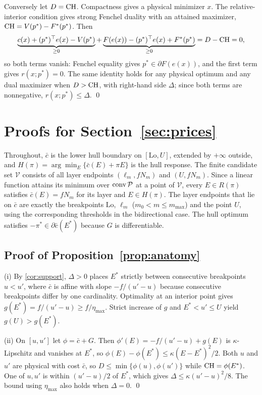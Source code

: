 Conversely let $D=\mathrm{CH}$. Compactness gives a physical minimizer $x$. The
relative-interior condition gives strong Fenchel duality with an attained
maximizer, $\mathrm{CH}=V(p^*)-F^*(p^*)$. Then
\[
 \underbrace{c(x)+(p^*)^\top e(x)-V(p^*)}_{\ge0}
 +\underbrace{F(e(x))-(p^*)^\top e(x)+F^*(p^*)}_{\ge0}=D-\mathrm{CH}=0,
\]
so both terms vanish: Fenchel equality gives $p^*\in\partial F(e(x))$, and the
first term gives $r(x;p^*)=0$. The same identity holds for any physical optimum and
any dual maximizer when $D>\mathrm{CH}$, with right-hand side $\Delta$; since both terms are
nonnegative, $r(x;p^*)\le\Delta$. \qed

\section{Proofs for Section~\ref{sec:prices}}\label{app:prices}

Throughout, $\bar c$ is the lower hull boundary on $[\mathrm{Lo},U]$, extended by
$+\infty$ outside, and $H(\pi)=\arg\min_E\{\bar c(E)+\pi E\}$ is the hull response.
The finite candidate set $\mathcal V$ consists of all layer endpoints $(\ell_m,fN_m)$
and $(U,fN_m)$. Since a linear function attains its minimum over $\operatorname{conv}\mathcal P$
at a point of $\mathcal V$, every $E\in R(\pi)$ satisfies $\bar c(E)=fN_m$ for its
layer and $E\in H(\pi)$. The layer endpoints that lie on $\bar c$ are exactly the
breakpoints $\mathrm{Lo}$, $\ell_m$ ($m_0<m\le m_{\max}$) and the point $U$,
using the corresponding thresholds in the bidirectional case. The hull optimum satisfies
$-\pi^*\in\partial\bar c(E^*)$ because $G$ is differentiable.

\subsection{Proof of Proposition~\ref{prop:anatomy}}
(i) By \cref{cor:support}, $\Delta>0$ places $E^*$ strictly between consecutive
breakpoints $u<u'$, where $\bar c$ is affine with slope $-f/(u'-u)$ because
consecutive breakpoints differ by one cardinality. Optimality at an interior point
gives $g(E^*)=f/(u'-u)\ge f/\eta_{\max}$. Strict increase of $g$ and
$E^*<u'\le U$ yield $g(U)>g(E^*)$.

(ii) On $[u,u']$ let $\phi=\bar c+G$. Then $\phi'(E)=-f/(u'-u)+g(E)$ is
$\kappa$-Lipschitz and vanishes at $E^*$, so $\phi(E)-\phi(E^*)\le\kappa(E-E^*)^2/2$.
Both $u$ and $u'$ are physical with cost $\bar c$, so
$D\le\min\{\phi(u),\phi(u')\}$ while $\mathrm{CH}=\phi(E^*)$. One of $u,u'$ is within
$(u'-u)/2$ of $E^*$, which gives $\Delta\le\kappa(u'-u)^2/8$. The bound
using $\eta_{\max}$ also holds when $\Delta=0$. \qed

